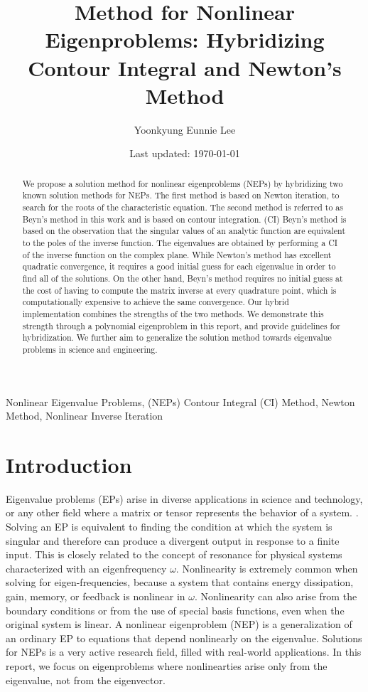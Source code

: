 \documentclass[11pt,letterpaper]{article}
\title{Method for Nonlinear Eigenproblems: Hybridizing Contour Integral and Newton's Method}
\author{Yoonkyung Eunnie Lee}
\date{Last updated: \today}
\begin{document}
\maketitle
\thispagestyle{empty}

\begin{abstract}
We propose a solution method for nonlinear eigenproblems (NEPs) by hybridizing two known solution methods for NEPs. The first method is based on Newton iteration, to search for the roots of the characteristic equation. The second method is referred to as Beyn's method in this work and is based on contour integration. (CI) Beyn's method is based on the observation that the singular values of an analytic function are equivalent to the poles of the inverse function. The eigenvalues are obtained by performing a CI of the inverse function on the complex plane.  
While Newton's method has excellent quadratic convergence, it requires a good initial guess for each eigenvalue in order to find all of the solutions. On the other hand, Beyn's method requires no initial guess at the cost of having to compute the matrix inverse at every quadrature point, which is computationally expensive to achieve the same convergence. Our hybrid implementation combines the strengths of the two methods. We demonstrate this strength through a polynomial eigenproblem in this report, and provide guidelines for hybridization. We further aim to generalize the solution method towards eigenvalue problems in science and engineering. 

\end{abstract}
Nonlinear Eigenvalue Problems, (NEPs) Contour Integral (CI) Method, Newton Method, Nonlinear Inverse Iteration
\section{Introduction} 
Eigenvalue problems (EPs) arise in diverse applications in science and technology, or any other field where a matrix or tensor represents the behavior of a system. \citep{guillaume_nonlinear_1999, betcke2013nlevp}. Solving an EP is equivalent to finding the condition at which the system is singular and therefore can produce a divergent output in response to a finite input. This is closely related to the concept of resonance for physical systems characterized with an eigenfrequency $\omega$. Nonlinearity is extremely common when solving for eigen-frequencies, because a system that contains energy dissipation, gain, memory, or feedback is nonlinear in $\omega$. Nonlinearity can also arise from the boundary conditions or from the use of special basis functions, even when the original system is linear. A nonlinear eigenproblem (NEP) is a generalization of an ordinary EP to equations that depend nonlinearly on the eigenvalue. Solutions for NEPs is a very active research field, filled with real-world applications. In this report, we focus on eigenproblems where nonlinearties arise only from the eigenvalue, not from the eigenvector.  
\end{document}
